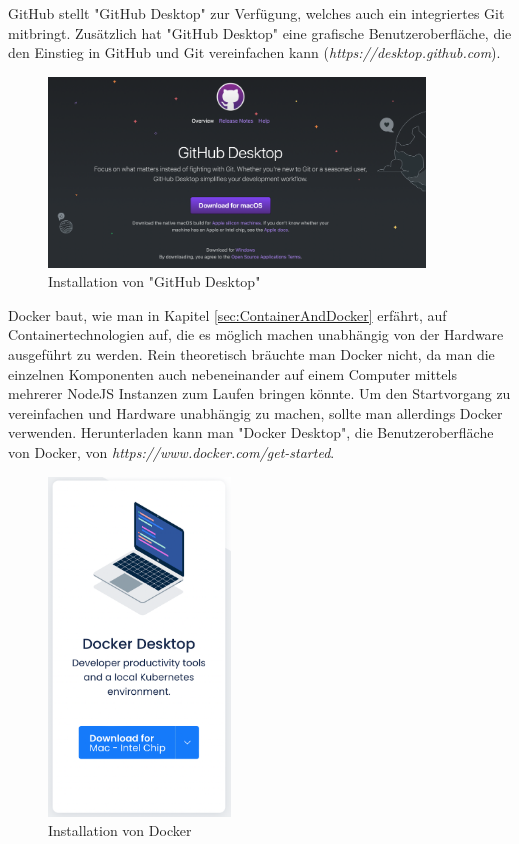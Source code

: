 GitHub stellt "GitHub Desktop" zur Verfügung, welches auch ein integriertes Git mitbringt. Zusätzlich hat "GitHub Desktop" eine grafische  Benutzeroberfläche, die den Einstieg in GitHub und Git vereinfachen kann (\emph{https://desktop.github.com}). 

\begin{figure}[H]
    \centering
    \includegraphics[width=100mm]{media/Handbuch/github_desktop.png}
    \caption{Installation von "GitHub Desktop"}
    \label{fig:githubdesktop}
\end{figure}


Docker baut, wie man in Kapitel \ref{sec:ContainerAndDocker} erfährt, auf Containertechnologien auf, die es möglich machen unabhängig von der Hardware ausgeführt zu werden. Rein theoretisch bräuchte man Docker nicht, da man die einzelnen Komponenten auch nebeneinander auf einem Computer mittels mehrerer NodeJS Instanzen zum Laufen bringen könnte. Um den Startvorgang zu vereinfachen und Hardware unabhängig zu machen, sollte man allerdings Docker verwenden. Herunterladen kann man "Docker Desktop", die Benutzeroberfläche von Docker, von \emph{https://www.docker.com/get-started}.

\begin{figure}[H]
    \centering
    \includegraphics[height=90mm]{media/Handbuch/dockerdesktop.png}
    \caption{Installation von Docker}
\end{figure}

